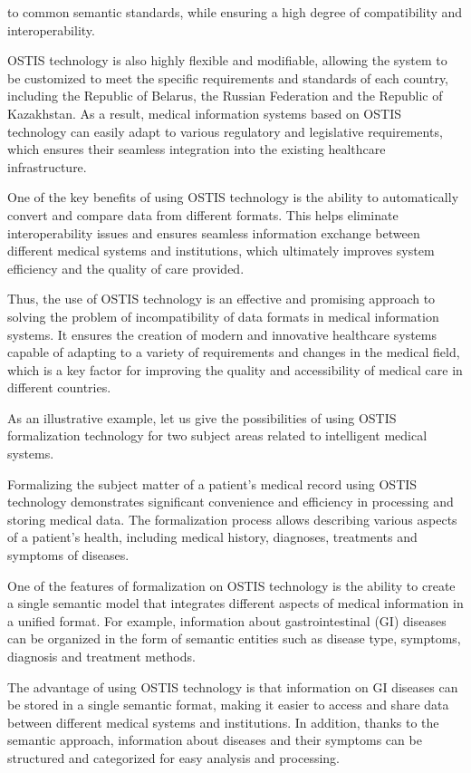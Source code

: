 \documentclass{article}
\begin{document}
\begin{multicols}{2}
to common semantic standards, while ensuring a high
degree of compatibility and interoperability.
\par OSTIS technology is also highly flexible and modifiable, allowing the system to be customized to meet
the specific requirements and standards of each country,
including the Republic of Belarus, the Russian Federation
and the Republic of Kazakhstan. As a result, medical information systems based on OSTIS technology can easily
adapt to various regulatory and legislative requirements,
which ensures their seamless integration into the existing healthcare infrastructure.
\par One of the key benefits of using OSTIS technology is the ability to automatically convert and compare data from different formats. This helps eliminate interoperability issues and ensures seamless information exchange between different medical systems and institutions, which ultimately improves system efficiency and the quality of care provided. 
\par Thus, the use of OSTIS technology is an effective and promising approach to solving the problem of incompatibility of data formats in medical information systems. It ensures the creation of modern and innovative healthcare systems capable of adapting to a variety of requirements and changes in the medical field, which is a key factor for improving the quality and accessibility of medical care in different countries. 
\par As an illustrative example, let us give the possibilities of using OSTIS formalization technology for two subject areas related to intelligent medical systems.
\par Formalizing the subject matter of a patient’s medical record using OSTIS technology demonstrates significant convenience and efficiency in processing and storing medical data. The formalization process allows describing various aspects of a patient’s health, including medical history, diagnoses, treatments and symptoms of diseases. \par One of the features of formalization on OSTIS technology is the ability to create a single semantic model that integrates different aspects of medical information in a unified format. For example, information about gastrointestinal (GI) diseases can be organized in the form of semantic entities such as disease type, symptoms, diagnosis and treatment methods. 
\par The advantage of using OSTIS technology is that information on GI diseases can be stored in a single semantic format, making it easier to access and share data between different medical systems and institutions. In addition, thanks to the semantic approach, information about diseases and their symptoms can be structured and categorized for easy analysis and processing. 

\end{multicols}
\end{document}
